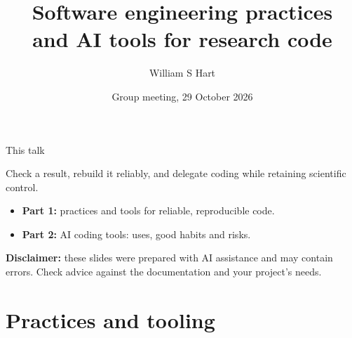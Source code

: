 \documentclass[aspectratio=169]{beamer}
\title[Software engineering and AI]{Software engineering
practices\\and AI tools for research code}
\author{William S Hart}
\institute{Infectious Disease Modelling Group\\Mathematical
Institute, University of Oxford}
\date[29 October 2026]{Group meeting, 29 October 2026}
\begin{document}
\begin{frame}[plain]
  \titlepage
\end{frame}

\begin{frame}{This talk}
  \begin{minipage}{\linewidth}
    \large\color{oxfordblue}Check a result, rebuild it reliably, and
    delegate coding
    while retaining scientific control.
  \end{minipage}\par
  \vspace{5mm}
  \begin{itemize}
    \item \textbf{Part 1:} practices and tools for reliable, reproducible code.
    \item \textbf{Part 2:} AI coding tools: uses, good habits and risks.
  \end{itemize}

  \vspace{5mm}
  \begin{tcolorbox}[enhanced, colback=oxamber!10, frame hidden, arc=1.5mm,
      borderline west={1mm}{0pt}{oxamber}, left=3mm, right=3mm,
      top=2mm, bottom=2mm,
    before upper={\raggedright}]
    \small\textbf{Disclaimer:} these slides were prepared with AI
    assistance and may contain
    errors. Check advice against the documentation and your project's needs.
  \end{tcolorbox}
\end{frame}

\section{Practices and tooling}
\end{document}
